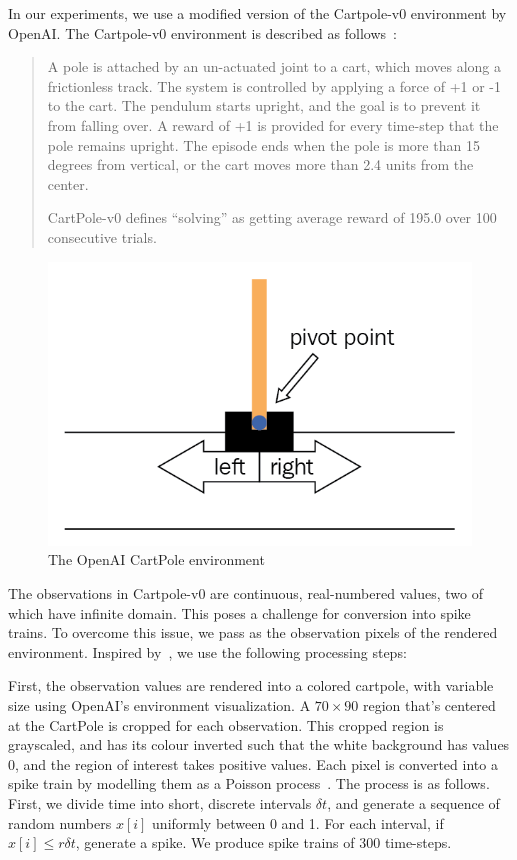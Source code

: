 \documentclass[fyp]{socreport}
\begin{document}
In our experiments, we use a modified version of the Cartpole-v0 environment by
OpenAI. The Cartpole-v0 environment is described as follows~\cite{openai_gym}:

\begin{quote} A pole is attached by an un-actuated joint to a cart, which moves
along a frictionless track. The system is controlled by applying a force of +1
or -1 to the cart. The pendulum starts upright, and the goal is to prevent it
from falling over. A reward of +1 is provided for every time-step that the pole
remains upright. The episode ends when the pole is more than 15 degrees from
vertical, or the cart moves more than 2.4 units from the center.

CartPole-v0 defines ``solving'' as getting average reward of 195.0 over 100
consecutive trials.

\end{quote}

\begin{figure}[htbp] \centering
  \includegraphics[width=.55\linewidth]{images/openai_gym.png}
  \caption{The OpenAI CartPole environment}
\end{figure}

The observations in Cartpole-v0 are continuous, real-numbered values, two of
which have infinite domain. This poses a challenge for conversion into spike
trains. To overcome this issue, we pass as the observation pixels of the
rendered environment. Inspired by~\cite{mnih2013playing}, we use the following
processing steps:

First, the observation values are rendered into a colored cartpole, with
variable size using OpenAI's environment visualization. A $70 \times 90$ region
that's centered at the CartPole is cropped for each observation. This cropped
region is grayscaled, and has its colour inverted such that the white background
has values 0, and the region of interest takes positive values. Each pixel is
converted into a spike train by modelling them as a Poisson
process~\cite{heeger2000poisson}. The process is as follows. First, we divide
time into short, discrete intervals \(\delta t\), and generate a sequence of
random numbers \(x[i]\) uniformly between 0 and 1. For each interval, if
\(x[i] \le r \delta t\), generate a spike. We produce spike trains of 300
time-steps.
\end{document}
